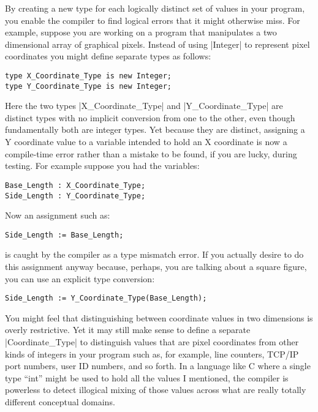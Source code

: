 By creating a new type for each logically distinct set of values in your program, you enable the
compiler to find logical errors that it might otherwise miss. For example, suppose you are
working on a program that manipulates a two dimensional array of graphical pixels. Instead of
using |Integer| to represent pixel coordinates you might define separate types as follows:

\begin{lstlisting}
type X_Coordinate_Type is new Integer;
type Y_Coordinate_Type is new Integer;
\end{lstlisting}

Here the two types |X_Coordinate_Type| and |Y_Coordinate_Type| are distinct types with no
implicit conversion from one to the other, even though fundamentally both are integer types. Yet
because they are distinct, assigning a Y coordinate value to a variable intended to hold an X
coordinate is now a compile-time error rather than a mistake to be found, if you are lucky,
during testing. For example suppose you had the variables:

\begin{lstlisting}
Base_Length : X_Coordinate_Type;
Side_Length : Y_Coordinate_Type;
\end{lstlisting}

\noindent Now an assignment such as:

\begin{lstlisting}
Side_Length := Base_Length;
\end{lstlisting}

\noindent is caught by the compiler as a type mismatch error. If you actually desire to do this
assignment anyway because, perhaps, you are talking about a square figure, you can use an
explicit type conversion:

\begin{lstlisting}
Side_Length := Y_Coordinate_Type(Base_Length);
\end{lstlisting}

You might feel that distinguishing between coordinate values in two dimensions is overly
restrictive. Yet it may still make sense to define a separate |Coordinate_Type| to distinguish
values that are pixel coordinates from other kinds of integers in your program such as, for
example, line counters, TCP/IP port numbers, user ID numbers, and so forth. In a language like C
where a single type ``int'' might be used to hold all the values I mentioned, the compiler is
powerless to detect illogical mixing of those values across what are really totally different
conceptual domains.

